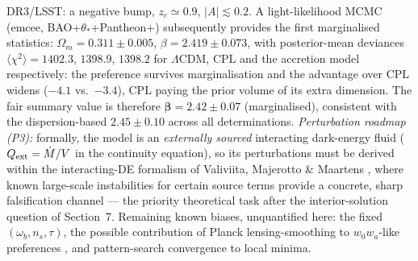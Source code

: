 \documentclass[11pt]{article}
\begin{document}
DR3/LSST: a negative bump, $z_c \simeq 0.9$, $|A| \lesssim 0.2$. A light-likelihood MCMC (emcee, BAO+$\theta_*$+Pantheon+) subsequently provides the first marginalised statistics: $\Omega_m = 0.311 \pm 0.005$, $\beta = 2.419 \pm 0.073$, with posterior-mean deviances $\langle\chi^2\rangle = 1402.3$, $1398.9$, $1398.2$ for $\Lambda$CDM, CPL and the accretion model respectively: the preference survives marginalisation and the advantage over CPL widens ($-4.1$ vs.\ $-3.4$), CPL paying the prior volume of its extra dimension. The fair summary value is therefore $\boldsymbol{\beta = 2.42 \pm 0.07}$ (marginalised), consistent with the dispersion-based $2.45 \pm 0.10$ across all determinations. \emph{Perturbation roadmap (P3):} formally, the model is an \emph{externally sourced} interacting dark-energy fluid ($Q_{\rm ext} = \dot M/V$ in the continuity equation), so its perturbations must be derived within the interacting-DE formalism of Valiviita, Majerotto \& Maartens \cite{Valiviita2008}, where known large-scale instabilities for certain source terms provide a concrete, sharp falsification channel --- the priority theoretical task after the interior-solution question of Section~7. Remaining known biases, unquantified here: the fixed $(\omega_b, n_s, \tau)$, the possible contribution of Planck lensing-smoothing to $w_0w_a$-like preferences \cite{Park2025}, and pattern-search convergence to local minima.
\end{document}
